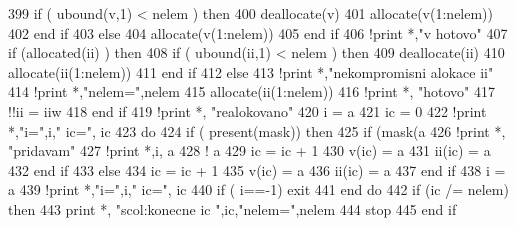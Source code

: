 \begin{DoxyCode}
399             \textcolor{keywordflow}{if} ( ubound(v,1) < nelem ) then
400                 \textcolor{keyword}{deallocate}(v)
401                 \textcolor{keyword}{allocate}(v(1:nelem))
402 \textcolor{keyword}{            end }if
403         else
404             \textcolor{keyword}{allocate}(v(1:nelem))
405 \textcolor{keyword}{        end }if
406         \textcolor{comment}{!print *,"v hotovo"
}
407         \textcolor{keywordflow}{if} (\textcolor{keyword}{allocated}(ii) ) then
408             \textcolor{keywordflow}{if} ( ubound(ii,1) < nelem ) then
409                 \textcolor{keyword}{deallocate}(ii)
410                 \textcolor{keyword}{allocate}(ii(1:nelem))
411 \textcolor{keyword}{            end }if
412         else
413             \textcolor{comment}{!print *,"nekompromisni alokace ii"
}
414             \textcolor{comment}{!print *,"nelem=",nelem
}
415             \textcolor{keyword}{allocate}(ii(1:nelem))
416             \textcolor{comment}{!print *, "hotovo"
}
417             \textcolor{comment}{!!ii = iiw
}
418 \textcolor{keyword}{        end }if
419         \textcolor{comment}{!print *, "realokovano"
}
420         i = a%
421         ic = 0
422         \textcolor{comment}{!print *,"i=",i," ic=", ic
}
423         do
424             \textcolor{keywordflow}{if} ( \textcolor{keyword}{present}(mask)) then
425                 \textcolor{keywordflow}{if} (mask(a%
426                     \textcolor{comment}{!print *, "pridavam"
}
427                     \textcolor{comment}{!print *,i, a%
}
428                     \textcolor{comment}{!    a%
}
429                     ic = ic + 1
430                     v(ic)  = a%
431                     ii(ic) = a%
432 \textcolor{keyword}{                end }if
433             else
434                 ic = ic + 1
435                 v(ic)  = a%
436                 ii(ic) = a%
437 \textcolor{keyword}{            end }if
438             i = a%
439             \textcolor{comment}{!print *,"i=",i," ic=", ic
}
440             \textcolor{keywordflow}{if} ( i==-1) exit
441 \textcolor{keyword}{        end }do
442         \textcolor{keywordflow}{if} (ic /= nelem) then
443             print *, \textcolor{stringliteral}{"scol:konecne ic "},ic,\textcolor{stringliteral}{"nelem="},nelem
444             stop
445 \textcolor{keyword}{        end }if
\end{DoxyCode}
